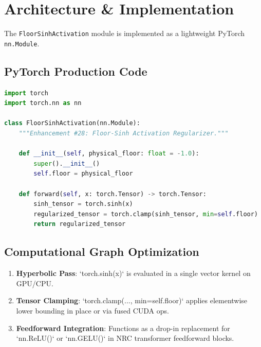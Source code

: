 \section{Architecture \& Implementation}

The \texttt{FloorSinhActivation} module is implemented as a lightweight PyTorch \texttt{nn.Module}.

\subsection{PyTorch Production Code}

\begin{lstlisting}[language=Python]
import torch
import torch.nn as nn

class FloorSinhActivation(nn.Module):
    """Enhancement #28: Floor-Sinh Activation Regularizer."""

    def __init__(self, physical_floor: float = -1.0):
        super().__init__()
        self.floor = physical_floor

    def forward(self, x: torch.Tensor) -> torch.Tensor:
        sinh_tensor = torch.sinh(x)
        regularized_tensor = torch.clamp(sinh_tensor, min=self.floor)
        return regularized_tensor
\end{lstlisting}

\subsection{Computational Graph Optimization}
\begin{enumerate}
    \item \textbf{Hyperbolic Pass}: `torch.sinh(x)` is evaluated in a single vector kernel on GPU/CPU.
    \item \textbf{Tensor Clamping}: `torch.clamp(..., min=self.floor)` applies elementwise lower bounding in place or via fused CUDA ops.
    \item \textbf{Feedforward Integration}: Functions as a drop-in replacement for `nn.ReLU()` or `nn.GELU()` in NRC transformer feedforward blocks.
\end{enumerate}
